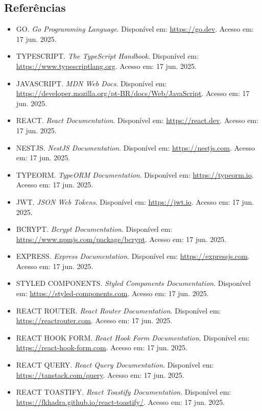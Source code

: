\documentclass[12pt, a4paper]{article}
\begin{document}
\begin{spacing}{1.5}
\section{Referências}
\begin{spacing}{1.5}
\begin{itemize}
    \item GO. \textit{Go Programming Language}. Disponível em: \url{https://go.dev}. Acesso em: 17 jun. 2025.
    \item TYPESCRIPT. \textit{The TypeScript Handbook}. Disponível em: \url{https://www.typescriptlang.org}. Acesso em: 17 jun. 2025.
    \item JAVASCRIPT. \textit{MDN Web Docs}. Disponível em: \url{https://developer.mozilla.org/pt-BR/docs/Web/JavaScript}. Acesso em: 17 jun. 2025.
    \item REACT. \textit{React Documentation}. Disponível em: \url{https://react.dev}. Acesso em: 17 jun. 2025.
    \item NESTJS. \textit{NestJS Documentation}. Disponível em: \url{https://nestjs.com}. Acesso em: 17 jun. 2025.
    \item TYPEORM. \textit{TypeORM Documentation}. Disponível em: \url{https://typeorm.io}. Acesso em: 17 jun. 2025.
    \item JWT. \textit{JSON Web Tokens}. Disponível em: \url{https://jwt.io}. Acesso em: 17 jun. 2025.
    \item BCRYPT. \textit{Bcrypt Documentation}. Disponível em: \url{https://www.npmjs.com/package/bcrypt}. Acesso em: 17 jun. 2025.
    \item EXPRESS. \textit{Express Documentation}. Disponível em: \url{https://expressjs.com}. Acesso em: 17 jun. 2025.
    \item STYLED COMPONENTS. \textit{Styled Components Documentation}. Disponível em: \url{https://styled-components.com}. Acesso em: 17 jun. 2025.
    \item REACT ROUTER. \textit{React Router Documentation}. Disponível em: \url{https://reactrouter.com}. Acesso em: 17 jun. 2025.
    \item REACT HOOK FORM. \textit{React Hook Form Documentation}. Disponível em: \url{https://react-hook-form.com}. Acesso em: 17 jun. 2025.
    \item REACT QUERY. \textit{React Query Documentation}. Disponível em: \url{https://tanstack.com/query}. Acesso em: 17 jun. 2025.
    \item REACT TOASTIFY. \textit{React Toastify Documentation}. Disponível em: \url{https://fkhadra.github.io/react-toastify/}. Acesso em: 17 jun. 2025.

\end{itemize}
\end{spacing}
\end{spacing}
\end{document}
